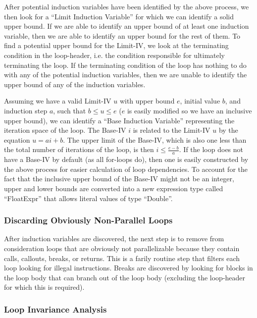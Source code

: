\documentclass[11pt]{article}
\begin{document}
After potential induction variables have been identified by the above
process, we then look for a ``Limit Induction Variable'' for which we
can identify a solid upper bound. If we are able to identify an upper
bound of at least one induction variable, then we are able to identify
an upper bound for the rest of them. To find a potential upper bound
for the Limit-IV, we look at the terminating condition in the
loop-header, i.e. the condition responsible for ultimately terminating
the loop. If the terminating condition of the loop has nothing to do
with any of the potential induction variables, then we are unable to
identify the upper bound of any of the induction variables. 

Assuming we have a valid Limit-IV $u$ with upper bound $e$, initial value
$b$, and induction step $a$, such that $b \leq u \leq e$ ($e$ is easily
modified so we have an inclusive upper bound), we can identify a
``Base Induction Variable'' representing the iteration space of the
loop. The Base-IV $i$ is related to the Limit-IV $u$ by the equation
$u = ai + b$. The upper limit of the Base-IV, which is also one less than the total
number of iterations of the loop, is then $i \leq \frac{e-b}{a}$. If
the loop does not have a Base-IV by default (as all for-loops do),
then one is easily constructed by the above process for easier
calculation of loop dependencies. To account for the fact that the
inclusive upper bound of the Base-IV might not be an integer, upper
and lower bounds are converted into a new expression type called
``FloatExpr'' that allows literal values of type ``Double''.

\subsubsection {Discarding Obviously Non-Parallel Loops} 

After induction variables are discovered, the next step is to remove
from consideration loops that are obviously not parallelizable because
they contain calls, callouts, breaks, or returns. This is a farily
routine step that filters each loop looking for illegal
instructions. Breaks are discovered by looking for blocks in the loop
body that can branch out of the loop body (excluding the loop-header for
which this is required). 

\subsubsection {Loop Invariance Analysis} 
\end{document}
